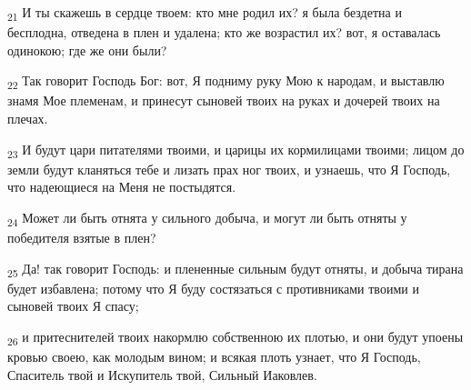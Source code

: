 \begin{tcolorbox}
\textsubscript{21} И ты скажешь в сердце твоем: кто мне родил их? я была бездетна и бесплодна, отведена в плен и удалена; кто же возрастил их? вот, я оставалась одинокою; где же они были?
\end{tcolorbox}
\begin{tcolorbox}
\textsubscript{22} Так говорит Господь Бог: вот, Я подниму руку Мою к народам, и выставлю знамя Мое племенам, и принесут сыновей твоих на руках и дочерей твоих на плечах.
\end{tcolorbox}
\begin{tcolorbox}
\textsubscript{23} И будут цари питателями твоими, и царицы их кормилицами твоими; лицом до земли будут кланяться тебе и лизать прах ног твоих, и узнаешь, что Я Господь, что надеющиеся на Меня не постыдятся.
\end{tcolorbox}
\begin{tcolorbox}
\textsubscript{24} Может ли быть отнята у сильного добыча, и могут ли быть отняты у победителя взятые в плен?
\end{tcolorbox}
\begin{tcolorbox}
\textsubscript{25} Да! так говорит Господь: и плененные сильным будут отняты, и добыча тирана будет избавлена; потому что Я буду состязаться с противниками твоими и сыновей твоих Я спасу;
\end{tcolorbox}
\begin{tcolorbox}
\textsubscript{26} и притеснителей твоих накормлю собственною их плотью, и они будут упоены кровью своею, как молодым вином; и всякая плоть узнает, что Я Господь, Спаситель твой и Искупитель твой, Сильный Иаковлев.
\end{tcolorbox}
